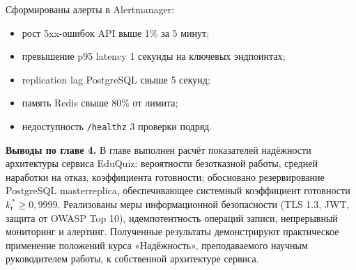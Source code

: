 Сформированы алерты в Alertmanager:
\begin{itemize}[noitemsep]
    \item рост 5xx-ошибок API выше 1\% за 5 минут;
    \item превышение p95 latency 1 секунды на ключевых эндпоинтах;
    \item replication lag PostgreSQL свыше 5 секунд;
    \item память Redis свыше 80\% от лимита;
    \item недоступность \texttt{/healthz} 3 проверки подряд.
\end{itemize}

\textbf{Выводы по главе 4.}
В главе выполнен расчёт показателей надёжности архитектуры
сервиса EduQuiz: вероятности безотказной работы, средней наработки
на отказ, коэффициента готовности; обосновано резервирование
PostgreSQL master\textendash replica, обеспечивающее системный
коэффициент готовности $k_{\text{г}}^{\,*} \geq 0{,}9999$.
Реализованы меры информационной безопасности (TLS 1.3, JWT,
защита от OWASP Top 10), идемпотентность операций записи,
непрерывный мониторинг и алертинг. Полученные результаты
демонстрируют практическое применение положений курса
«Надёжность», преподаваемого научным руководителем работы,
к собственной архитектуре сервиса.

\newpage
